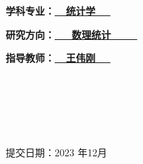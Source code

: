 \documentclass[a4paper,12pt,openany,oneside,utf-8]{ctexbook}
\newcommand{\sanhao}{\fontsize{15.75pt}{\baselineskip}\selectfont}
\begin{document}
\begin{titlepage}
\begin{center}
\textbf{\kaishu\sanhao 学科专业：\underline{\quad \quad \quad \ \ 统计学 \ \ \quad \quad \quad}}
\end{center}


\begin{center}
\textbf{\kaishu\sanhao 研究方向：\underline{\quad \quad \ \ \ 数理统计 \ \ \ \ \quad \quad}}
\end{center}

\begin{center}
\textbf{\kaishu\sanhao 指导教师：\underline{\quad \quad \quad \ \  王伟刚 \ \ \quad \quad \quad  }}
\end{center}

\

\

\


\begin{center}
\kaishu\sanhao 提交日期：2023 年12月
\end{center}
\end{titlepage}
















\end{document}
